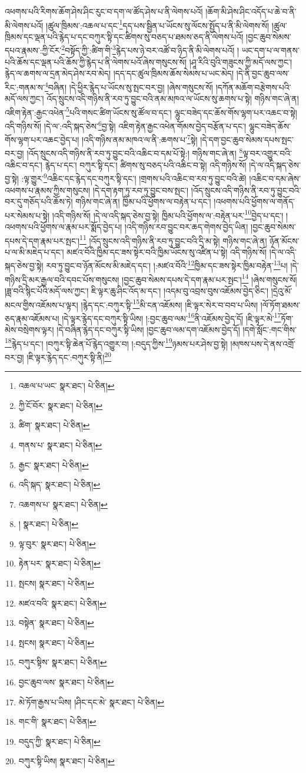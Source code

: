 འཕགས་པའི་རིགས་ཆོག་ཤེས་ཤིང་རུང་བ་དག་ལ་ཚོད་ཤེས་པ་ནི་ལེགས་པའོ། །ཆོག་མི་ཤེས་ཤིང་འདོད་པ་ཆེ་བ་ནི་མི་ལེགས་པའོ། །ཚུལ་ཁྲིམས་:འཆལ་པ་དང་\footnote{འཆལ་པ་ཡང་  སྣར་ཐང་།  པེ་ཅིན། }དད་པས་སྦྱིན་པ་ཡོངས་སུ་ལོངས་སྤྱོད་པ་ནི་མི་ལེགས་སོ། །ཚུལ་ཁྲིམས་དང་ལྡན་པའི་རྙེད་པ་དང་བཀུར་སྟི་དང་ཚིགས་སུ་བཅད་པ་ཐམས་ཅད་ནི་ལེགས་པའོ། །བྱང་ཆུབ་སེམས་དཔའ་རྣམས་:ཀྱི་ངོར་\footnote{ཀྱི་ངོ་བོར་  སྣར་ཐང་།  པེ་ཅིན། }བསྟོད་ཀྱི་:ཚིག་གི་\footnote{ཚིག་  སྣར་ཐང་།  པེ་ཅིན། }རྙེད་པས་ཉེ་བར་འཚོ་བ་ཉིད་ནི་མི་ལེགས་པའོ། །
ཡང་དག་པ་ལ་གནས་པའི་ཆོས་དང་ལྡན་པའི་ཆོས་ཀྱི་རྙེད་པ་ནི་ལེགས་པའོ་ཞེས་གསུངས་སོ། །ཤཱ་རིའི་བུའི་གཟུངས་ཀྱི་མདོ་ལས་ཀྱང་། རྙེད་ལ་ཆགས་ལ་དྲན་མེད་ཤེས་རབ་མེད། །དད་དང་ཚུལ་ཁྲིམས་ཆོས་སེམས་པ་ཡང་མེད། །དེ་ནི་བྱང་ཆུབ་ལས་རིང་:གནམ་ས་\footnote{གནས་པ་  སྣར་ཐང་།  པེ་ཅིན། }བཞིན། །དེ་ཕྱིར་རྙེད་པ་ཡོངས་སུ་སྤང་བར་བྱ། །ཞེས་གསུངས་སོ། །དཀོན་མཆོག་བརྩེགས་པའི་མདོ་ལས་ཀྱང་། འོད་སྲུངས་འདི་གཉིས་ནི་རབ་ཏུ་བྱུང་བའི་ནམ་མཁའ་ལ་ཡོངས་སུ་ཆགས་པ་སྟེ། གཉིས་གང་ཞེ་ན། འཇིག་རྟེན་:རྒྱང་འཕེན་\footnote{རྒྱང་  སྣར་ཐང་།  པེ་ཅིན། }པའི་གསང་ཚིག་ཡོངས་སུ་ཚོལ་བ་དང་། ལྷུང་བཟེད་དང་ཆོས་གོས་ལྷག་པར་འཆང་བ་སྟེ། འདི་གཉིས་སོ། །དེ་ལ་:འདི་སྐད་ཅེས་\footnote{འདི་སྐད་  སྣར་ཐང་།  པེ་ཅིན། }བྱ་སྟེ། འཇིག་རྟེན་རྒྱང་འཕེན་གོམས་བྱེད་བརྩོན་པ་དང་། ལྷུང་བཟེད་ཆོས་གོས་ལྷག་པར་འཆང་བྱེད་པ། །འདི་གཉིས་ནམ་མཁའ་ལ་ནི་:ཆགས་པ་\footnote{འཆགས་པ་  སྣར་ཐང་།  པེ་ཅིན། }སྟེ། །དེ་དག་བྱང་ཆུབ་སེམས་དཔས་སྤང་བར་བྱ། །འོད་སྲུངས་འདི་གཉིས་ནི་རབ་ཏུ་བྱུང་བའི་འཆིང་བ་དམ་པོ་སྟེ:། གཉིས་གང་ཞེ་ན། \footnote{།    སྣར་ཐང་།  པེ་ཅིན། }ལྟ་བར་འགྱུར་བའི་འཆིང་བ་དང་། རྙེད་པ་དང་། བཀུར་སྟི་དང་། ཚིགས་སུ་བཅད་པའི་འཆིང་བ་སྟེ། འདི་གཉིས་སོ། །དེ་ལ་འདི་སྐད་ཅེས་བྱ་སྟེ། :ལྟ་གྱུར་\footnote{ལྟ་བུར་  སྣར་ཐང་།  པེ་ཅིན། }འཆིང་དང་རྙེད་དང་བཀུར་སྟི་དང་། །གྲགས་པའི་འཆིང་བ་རབ་ཏུ་བྱུང་བའི་ཚེ། །འཆིང་བ་དམ་ཞེས་འཕགས་པ་རྣམས་ཀྱིས་གསུངས། །དེ་དག་རྟག་ཏུ་རབ་ཏུ་བྱུང་བས་སྤང་། །འོད་སྲུངས་འདི་གཉིས་ནི་རབ་ཏུ་བྱུང་བའི་བར་དུ་གཅོད་པའི་ཆོས་ཏེ། གཉིས་གང་ཞེ་ན། ཁྱིམ་པའི་ཕྱོགས་ལ་བརྟེན་པ་དང་། །འཕགས་པའི་ཕྱོགས་ལ་གནོད་པར་སེམས་པ་སྟེ། །འདི་གཉིས་སོ། །དེ་ལ་འདི་སྐད་ཅེས་བྱ་སྟེ། ཁྱིམ་པའི་ཕྱོགས་ལ་:བརྟེན་པར་\footnote{རྟེན་པར་  སྣར་ཐང་།  པེ་ཅིན། }བྱེད་པ་དང་། །འཕགས་པའི་ཕྱོགས་ལ་རྣམ་པར་སྨོད་བྱེད་པ། །འདི་གཉིས་རབ་བྱུང་བར་ཆད་གེགས་བྱེད་ཡིན། །བྱང་ཆུབ་སེམས་དཔས་དེ་དག་རྣམ་པར་སྤང་།\footnote{སྤངས།  སྣར་ཐང་།  པེ་ཅིན། } །འོད་སྲུངས་འདི་གཉིས་ནི་རབ་ཏུ་བྱུང་བའི་དྲི་མ་སྟེ། གཉིས་གང་ཞེ་ན། ཉོན་མོངས་པ་ལ་མི་མཇེད་པ་དང་། མཛའ་བོའི་ཁྱིམ་དང་ཟས་སྟེར་བའི་ཁྱིམ་ཡོངས་སུ་འཛིན་པ་སྟེ། འདི་གཉིས་སོ། །དེ་ལ་འདི་སྐད་ཅེས་བྱ་སྟེ། རབ་ཏུ་བྱུང་བ་ཉོན་མོངས་མི་མཇེད་དང་། །:མཛའ་བོའི་\footnote{མཛའ་བའི་  སྣར་ཐང་།  པེ་ཅིན། }ཁྱིམ་དང་ཟས་སྟེར་ཁྱིམ་བརྟེན་\footnote{བསྟེན་  སྣར་ཐང་།  པེ་ཅིན། }པ། །དེ་གཉིས་དྲི་མར་རྒྱལ་བའི་དབང་པོས་གསུངས། །བྱང་ཆུབ་སེམས་དཔས་དེ་དག་རྣམ་པར་སྤང་།\footnote{སྤངས།  སྣར་ཐང་།  པེ་ཅིན། } །ཞེས་གསུངས་སོ། །ཟླ་བའི་སྙིང་པོའི་མདོ་ལས་ཀྱང་། ཇི་ལྟར་ཆུ་ཤིང་འོད་མ་དང་། །འདམ་བུ་འབྲས་བུས་འཇོམས་བྱེད་ཅིང་། །དྲེའུ་མོ་མངལ་གྱིས་འཇོམས་པ་ལྟར། །རྙེད་དང་:བཀུར་སྟི་\footnote{བཀུར་སྟིས་  སྣར་ཐང་།  པེ་ཅིན། }མི་ངན་འཇོམས། །ཇི་ལྟར་སེར་བ་བབ་པ་ཡིས། །ལོ་ཏོག་ཐམས་ཅད་རྣམ་འཇོམས་པ། །དེ་ལྟར་རྙེད་དང་བཀུར་སྟི་ཡིས། །:བྱང་ཆུབ་ལམ་\footnote{བྱང་ཆུབ་ལས་  སྣར་ཐང་།  པེ་ཅིན། }ནི་འཇོམས་བྱེད་དོ། །ཇི་ལྟར་མེ་\footnote{མེ་ཏོག་རྒྱས་པ་ཡིས། །ཤིང་དང་མེ་  སྣར་ཐང་།  པེ་ཅིན། }ཏོག་མེས་བསྲེགས་ལྟར། །དེ་བཞིན་རྙེད་དང་བཀུར་སྟི་ཡིས། །བྱང་ཆུབ་ལམ་དག་འཇོམས་བྱེད་དོ། །དགེ་སློང་:གང་གིས་\footnote{གང་གི་  སྣར་ཐང་།  པེ་ཅིན། }རྙེད་པ་དང་། །བཀུར་སྟི་ཆེན་པོ་རྙེད་འགྱུར་བ། །:བདུད་ཀྱིས་\footnote{བདུད་ཀྱི་  སྣར་ཐང་།  པེ་ཅིན། }ཉམས་པར་ཤེས་བྱ་སྟེ། །མཁས་པས་དེ་ནས་འགྲོ་བར་བྱ། །ཇི་ལྟར་རྙེད་དང་:བཀུར་སྟི་ནི།\footnote{བཀུར་སྟི་ཡིས།  སྣར་ཐང་།  པེ་ཅིན། } 